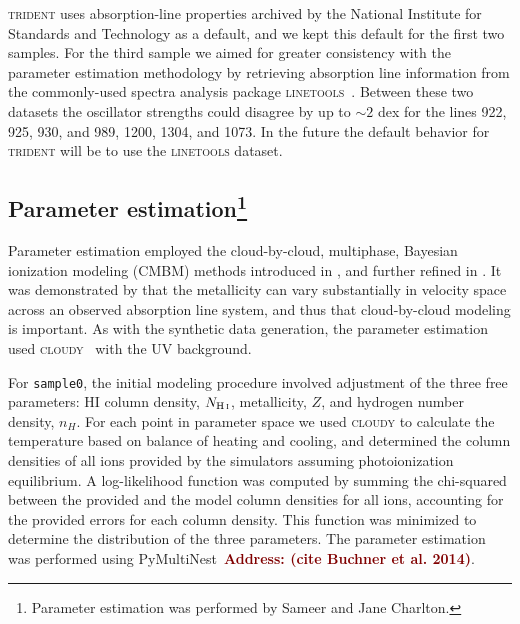 \documentclass[fleqn,usenatbib]{mnras}
\newcommand{\todo}[1]{\textcolor{Maroon}{\textbf{Address: #1}}}
\begin{document}
\textsc{trident} uses absorption-line properties archived by the National Institute for Standards and Technology as a default, and we kept this default for the first two samples.
For the third sample we aimed for greater consistency with the parameter estimation methodology by retrieving absorption line information from the commonly-used spectra analysis package \textsc{linetools}~\citep{Prochaska2016}.
Between these two datasets the oscillator strengths could disagree by up to $\sim 2$ dex for the lines  922, 925, 930, and 989,  1200,  1304, and  1073.
In the future the default behavior for \textsc{trident} will be to use the \textsc{linetools} dataset.


\subsection[Parameter estimation]{Parameter estimation\footnote{
 Parameter estimation was performed by Sameer and Jane Charlton.}}
\label{s:  parameter estimation}

 Parameter estimation employed the cloud-by-cloud, multiphase, Bayesian ionization modeling (CMBM) methods introduced in \cite{Sameer2021}, and further refined in \cite{Sameer2022}.
 It was demonstrated by \cite{Zahedy2019} that the metallicity can vary substantially in velocity space across an observed absorption line system, and thus that cloud-by-cloud modeling is important.
 As with the synthetic data generation, the  parameter estimation used \textsc{cloudy}~\citep{Ferland2013} with the \cite{Haardt2012} UV background.

For \texttt{sample0}, the initial modeling procedure involved adjustment of the three free parameters:
HI column density, $N_{\ion{H}{I}}$, metallicity, $Z$, and hydrogen number density, $n_H$.
For each point in parameter space we used \textsc{cloudy} to calculate the temperature based on balance of heating and cooling,
and determined the column densities of all ions provided by the simulators assuming photoionization equilibrium.
A log-likelihood function was computed by summing the chi-squared between the provided and the model column densities for all ions, accounting for the provided errors for each column density.
This function was minimized to determine the distribution of the three parameters.
The parameter estimation was performed using PyMultiNest~\todo{(cite Buchner et al. 2014)}. 
\end{document}
